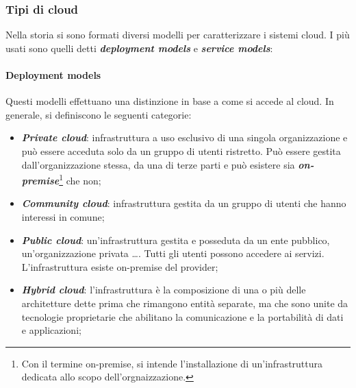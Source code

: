 \documentclass{article}
\begin{document}
\subsubsection{Tipi di cloud}
Nella storia si sono formati diversi modelli per caratterizzare i sistemi cloud. I più usati 
sono quelli detti \textbf{\textit{deployment models}} e \textbf{\textit{service models}}:

\paragraph{Deployment models} Questi modelli effettuano una distinzione in base a come si 
accede al cloud. In generale, si definiscono le seguenti categorie:
\begin{itemize}
  \item \textbf{\textit{Private cloud}}: infrastruttura a uso esclusivo di una singola 
    organizzazione e può essere acceduta solo da un gruppo di utenti ristretto. Può essere 
    gestita dall'organizzazione stessa, da una di terze parti e può esistere sia 
    \textbf{\textit{on-premise}}\footnote{Con il termine on-premise, si intende l'installazione 
    di un'infrastruttura dedicata allo scopo dell'orgnaizzazione.} che non;
  \item \textbf{\textit{Community cloud}}: infrastruttura gestita da un gruppo di utenti
    che hanno interessi in comune;
  \item \textbf{\textit{Public cloud}}: un'infrastruttura gestita e posseduta da un ente
    pubblico, un'organizzazione privata \dots. Tutti gli utenti possono accedere ai servizi.
    L'infrastruttura esiste on-premise del provider;
  \item \textbf{\textit{Hybrid cloud}}: l'infrastruttura è la composizione di una o più 
    delle architetture dette prima che rimangono entità separate, ma che sono unite da 
    tecnologie proprietarie che abilitano la comunicazione e la portabilità di dati e 
    applicazioni;
\end{itemize}
\end{document}
